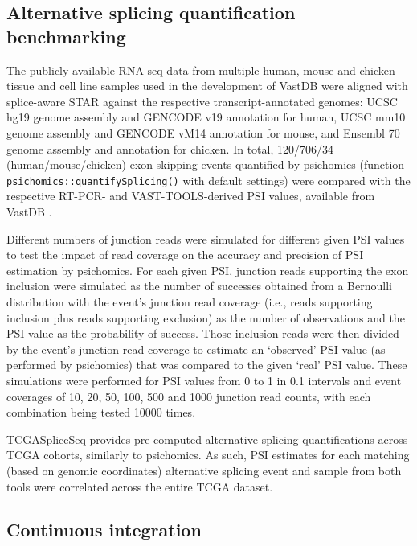 \subsection{Alternative splicing quantification benchmarking}

The publicly available RNA-seq data from multiple human, mouse and chicken tissue and cell line samples used in the development of VastDB \cite{tapial:2017ui} were aligned with splice-aware STAR \cite{dobin:2013ts} against the respective transcript-annotated genomes: UCSC hg19 genome assembly and GENCODE v19 annotation for human, UCSC mm10 genome assembly and GENCODE vM14 annotation for mouse, and Ensembl 70 genome assembly and annotation for chicken. In total, 120/706/34 (human/mouse/chicken) exon skipping events quantified by psichomics (function \texttt{psichomics::quantifySplicing()} with default settings) were compared with the respective RT-PCR- and VAST-TOOLS-derived PSI values, available from VastDB \cite{tapial:2017ui}.

Different numbers of junction reads were simulated for different given PSI values to test the impact of read coverage on the accuracy and precision of PSI estimation by psichomics. For each given PSI, junction reads supporting the exon inclusion were simulated as the number of successes obtained from a Bernoulli distribution with the event's junction read coverage (i.e., reads supporting inclusion plus reads supporting exclusion) as the number of observations and the PSI value as the probability of success. Those inclusion reads were then divided by the event's junction read coverage to estimate an ‘observed’ PSI value (as performed by psichomics) that was compared to the given ‘real’ PSI value. These simulations were performed for PSI values from 0 to 1 in 0.1 intervals and event coverages of 10, 20, 50, 100, 500 and 1000 junction read counts, with each combination being tested 10000 times.

TCGASpliceSeq \cite{ryan:2016tm} provides pre-computed alternative splicing quantifications across TCGA cohorts, similarly to \mbox{psichomics}. As such, PSI estimates for each matching (based on genomic coordinates) alternative splicing event and sample from both tools were correlated across the entire TCGA dataset.

\subsection{Continuous integration}
\label{subsec:psichomics-ci}

